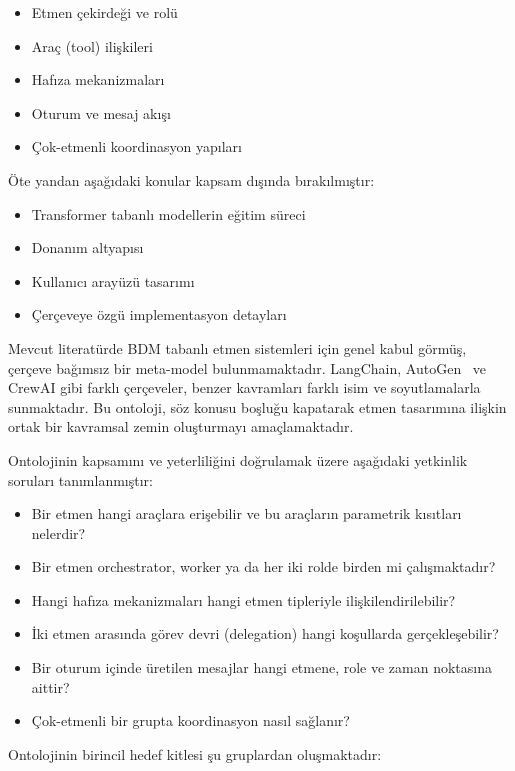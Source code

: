 \documentclass[10pt, a4paper, twocolumn]{article}
\begin{document}
\begin{itemize}
    \item Etmen çekirdeği ve rolü
    \item Araç (tool) ilişkileri
    \item Hafıza mekanizmaları
    \item Oturum ve mesaj akışı
    \item Çok-etmenli koordinasyon yapıları
\end{itemize}

Öte yandan aşağıdaki konular kapsam dışında bırakılmıştır:

\begin{itemize}
    \item Transformer tabanlı modellerin eğitim süreci
    \item Donanım altyapısı
    \item Kullanıcı arayüzü tasarımı
    \item Çerçeveye özgü implementasyon detayları
\end{itemize}

Mevcut literatürde BDM tabanlı etmen sistemleri için genel kabul görmüş, çerçeve bağımsız bir meta-model bulunmamaktadır. LangChain, AutoGen~\cite{wu2024autogen} ve CrewAI gibi farklı çerçeveler, benzer kavramları farklı isim ve soyutlamalarla sunmaktadır. Bu ontoloji, söz konusu boşluğu kapatarak etmen tasarımına ilişkin ortak bir kavramsal zemin oluşturmayı amaçlamaktadır.

Ontolojinin kapsamını ve yeterliliğini doğrulamak üzere aşağıdaki yetkinlik soruları tanımlanmıştır:

\begin{itemize}
    \item Bir etmen hangi araçlara erişebilir ve bu araçların parametrik kısıtları nelerdir?
    \item Bir etmen orchestrator, worker ya da her iki rolde birden mi çalışmaktadır?
    \item Hangi hafıza mekanizmaları hangi etmen tipleriyle ilişkilendirilebilir?
    \item İki etmen arasında görev devri (delegation) hangi koşullarda gerçekleşebilir?
    \item Bir oturum içinde üretilen mesajlar hangi etmene, role ve zaman noktasına aittir?
    \item Çok-etmenli bir grupta koordinasyon nasıl sağlanır?
\end{itemize}

Ontolojinin birincil hedef kitlesi şu gruplardan oluşmaktadır:
\end{document}
